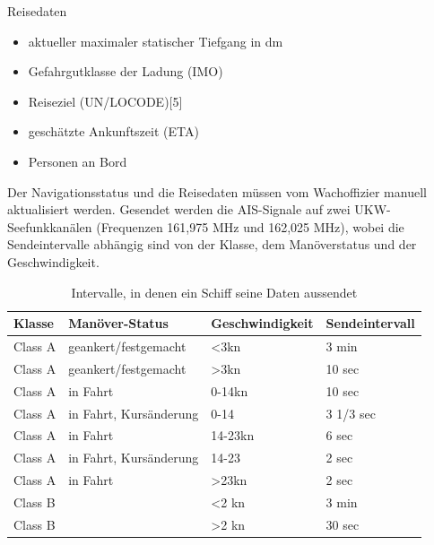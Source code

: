 Reisedaten
\begin{itemize}
\item aktueller maximaler statischer Tiefgang in dm
\item Gefahrgutklasse der Ladung (IMO)
\item Reiseziel (UN/LOCODE)[5]
\item geschätzte Ankunftszeit (ETA)
\item Personen an Bord
\end{itemize}

Der Navigationsstatus und die Reisedaten müssen vom Wachoffizier manuell aktualisiert werden. Gesendet werden die AIS-Signale auf zwei UKW-Seefunkkanälen (Frequenzen 161,975 MHz und 162,025 MHz), wobei die Sendeintervalle abhängig sind von der Klasse, dem Manöverstatus und der Geschwindigkeit.

\begin{table}[!hbt]\vspace{1ex}\centering
\begin{tabular}{|l|l|l|l|}\hline
Klasse &Manöver-Status & Geschwindigkeit &Sendeintervall\\\hline\hline
Class A&geankert/festgemacht&<3kn&3 min\\
Class A&geankert/festgemacht&>3kn&10 sec\\
Class A&in Fahrt&0-14kn&10 sec\\
Class A&in Fahrt, Kursänderung&0-14&3 1/3 sec\\
Class A&in Fahrt&14-23kn&6 sec\\
Class A&in Fahrt, Kursänderung&14-23&2 sec\\
Class A&in Fahrt&>23kn&2 sec\\
Class B&&<2 kn&3 min\\
Class B&&>2 kn&30 sec\\\hline
\end{tabular}
\caption[Intervalle, in denen ein Schiff seine Daten aussendet] {Intervalle, in denen ein Schiff seine Daten aussendet}
\end{table}


